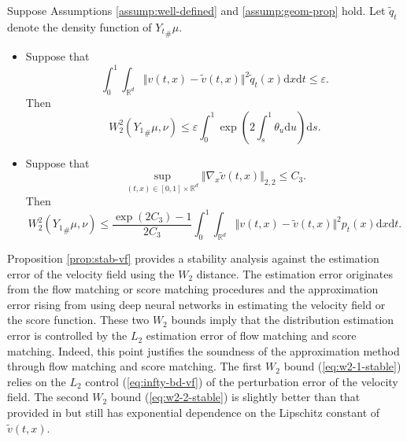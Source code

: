 \documentclass[twoside,11pt]{article}
\def\sR{{\mathbb{R}}}
\def\paref#1{(\ref{#1})}
\newcommand{\diff}{\mathrm{d}}
\numberwithin{equation}{section}
\begin{document}
\begin{proposition} \label{prop:stab-vf}
Suppose Assumptions \ref{assump:well-defined} and \ref{assump:geom-prop} hold. Let $\tilde{q}_t$ denote the density function of ${Y_t}_{\#} \mu$.
\begin{itemize}
\item[(i)] Suppose that
\begin{equation}
    \label{eq:infty-bd-vf}
    \int_0^1 \int_{\sR^d} \Vert v(t, x) - \tilde{v}(t, x) \Vert^2 \tilde{q}_t(x) \diff x \diff t \le \varepsilon.
\end{equation}
Then
\begin{equation}
    \label{eq:w2-1-stable}
    W_2^2({Y_1}_{\#} \mu, \nu) \le \varepsilon \int_0^1 \exp \left( 2 \int_s^1 \theta_u \diff u \right) \diff s.
\end{equation}
\item[(ii)] Suppose that
\begin{equation*}
    \sup_{(t, x) \in [0, 1] \times \sR^d} \Vert \nabla_x \tilde{v}(t, x) \Vert_{2,2} \le C_3.
\end{equation*}
Then
\begin{equation}
    \label{eq:w2-2-stable}
    W_2^2({Y_1}_{\#} \mu, \nu) \le \frac{\exp(2 C_3) - 1}{2 C_3} \int_0^1 \int_{\sR^d} \Vert v(t, x) - \tilde{v}(t, x) \Vert^2 p_t(x) \diff x \diff t.
\end{equation}
\end{itemize}
\end{proposition}


Proposition \ref{prop:stab-vf} provides a stability analysis against the estimation error of the velocity field using the $W_2$ distance.
    The estimation error originates from the flow matching or score matching procedures and
    the approximation error rising from using
     deep neural networks in
     estimating the velocity field or the score function. These two $W_2$ bounds imply that the distribution estimation error is controlled by the $L_2$ estimation error of flow matching and score matching.
    Indeed, this point justifies the soundness of the approximation method through flow matching and score matching.
    The first $W_2$ bound \paref{eq:w2-1-stable} relies on the $L_2$ control \paref{eq:infty-bd-vf} of the perturbation error of the velocity field.
    The second $W_2$ bound \paref{eq:w2-2-stable} is slightly better than that provided in \cite[Proposition 3]{albergo2023building} but still has exponential dependence on the Lipschitz constant of $\tilde{v}(t, x)$.
\end{document}
